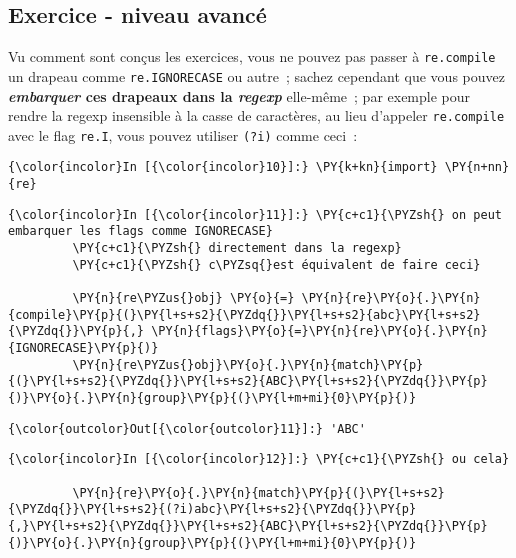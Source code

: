    \hypertarget{exercice---niveau-avancuxe9}{%
\subsection{Exercice - niveau
avancé}\label{exercice---niveau-avancuxe9}}

    Vu comment sont conçus les exercices, vous ne pouvez pas passer à
\texttt{re.compile} un drapeau comme \texttt{re.IGNORECASE} ou autre~;
sachez cependant que vous pouvez \textbf{\emph{embarquer} ces drapeaux
dans la \emph{regexp}} elle-même~; par exemple pour rendre la regexp
insensible à la casse de caractères, au lieu d'appeler
\texttt{re.compile} avec le flag \texttt{re.I}, vous pouvez utiliser
\texttt{(?i)} comme ceci~:

    \begin{Verbatim}[commandchars=\\\{\},frame=single,framerule=0.3mm,rulecolor=\color{cellframecolor}]
{\color{incolor}In [{\color{incolor}10}]:} \PY{k+kn}{import} \PY{n+nn}{re}
\end{Verbatim}


    \begin{Verbatim}[commandchars=\\\{\},frame=single,framerule=0.3mm,rulecolor=\color{cellframecolor}]
{\color{incolor}In [{\color{incolor}11}]:} \PY{c+c1}{\PYZsh{} on peut embarquer les flags comme IGNORECASE}
         \PY{c+c1}{\PYZsh{} directement dans la regexp}
         \PY{c+c1}{\PYZsh{} c\PYZsq{}est équivalent de faire ceci}
         
         \PY{n}{re\PYZus{}obj} \PY{o}{=} \PY{n}{re}\PY{o}{.}\PY{n}{compile}\PY{p}{(}\PY{l+s+s2}{\PYZdq{}}\PY{l+s+s2}{abc}\PY{l+s+s2}{\PYZdq{}}\PY{p}{,} \PY{n}{flags}\PY{o}{=}\PY{n}{re}\PY{o}{.}\PY{n}{IGNORECASE}\PY{p}{)}
         \PY{n}{re\PYZus{}obj}\PY{o}{.}\PY{n}{match}\PY{p}{(}\PY{l+s+s2}{\PYZdq{}}\PY{l+s+s2}{ABC}\PY{l+s+s2}{\PYZdq{}}\PY{p}{)}\PY{o}{.}\PY{n}{group}\PY{p}{(}\PY{l+m+mi}{0}\PY{p}{)}
\end{Verbatim}


\begin{Verbatim}[commandchars=\\\{\},frame=single,framerule=0.3mm,rulecolor=\color{cellframecolor}]
{\color{outcolor}Out[{\color{outcolor}11}]:} 'ABC'
\end{Verbatim}
            
    \begin{Verbatim}[commandchars=\\\{\},frame=single,framerule=0.3mm,rulecolor=\color{cellframecolor}]
{\color{incolor}In [{\color{incolor}12}]:} \PY{c+c1}{\PYZsh{} ou cela}
         
         \PY{n}{re}\PY{o}{.}\PY{n}{match}\PY{p}{(}\PY{l+s+s2}{\PYZdq{}}\PY{l+s+s2}{(?i)abc}\PY{l+s+s2}{\PYZdq{}}\PY{p}{,}\PY{l+s+s2}{\PYZdq{}}\PY{l+s+s2}{ABC}\PY{l+s+s2}{\PYZdq{}}\PY{p}{)}\PY{o}{.}\PY{n}{group}\PY{p}{(}\PY{l+m+mi}{0}\PY{p}{)}
\end{Verbatim}


